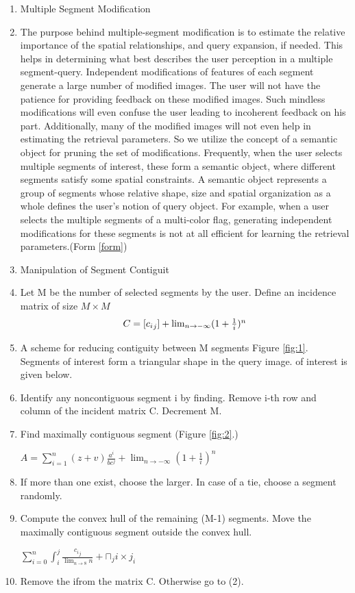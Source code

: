 \documentclass{acmart}
\begin{document}
\begin{enumerate}
    \item  	Multiple Segment Modification 
    \item   The purpose behind multiple-segment modification is to estimate the relative importance of the spatial relationships, and query expansion, if needed. This helps in determining what best describes the user perception in a multiple segment-query. Independent modifications of features of each segment generate a large number of modified images. The user will not have the patience for providing feedback on these modified images. Such mindless modifications will even confuse the user leading to incoherent feedback on his part. Additionally, many of the modified images will not even help in estimating the retrieval parameters. So we utilize the concept of a semantic object for pruning the set of modifications. Frequently, when the user selects multiple segments of interest, these form a semantic object, where different segments satisfy some spatial constraints. A semantic object represents a group of segments whose relative shape, size and spatial organization as a whole defines the user's notion of query object. For example, when a user selects the multiple segments of a multi-color flag, generating independent modifications for these segments is not at all efficient for learning the retrieval parameters.(Form \ref{form})
    \item Manipulation of Segment Contiguit
    \item Let M be the number of selected segments by the user. Define an incidence matrix of size $ M \times M$
    \begin{equation}
        $$C=[{c_i}_j]+\lim_{n \to -\infty}(1+\frac{1}{i})^n\label{form}$$
    \end{equation}
    \item A scheme for reducing contiguity between M segments Figure \ref{fig:1}. Segments of interest form a triangular shape in the query image. of interest is given below.
    
    \item Identify any noncontiguous segment i by finding. Remove i-th row and column of the incident matrix C. Decrement M.
    
    \item Find maximally contiguous segment (Figure \ref{fig:2}.)
    \begin{center}
    $A = \sum_{i=1}^n(z+v)\frac{a^i }{bc^j} + \lim_{n \to -\infty}(1+\frac{1}{i})^n$
    \end{center} 
    \item If more than one exist, choose the larger. In case of a tie, choose a segment randomly.
    \item Compute the convex hull of the remaining (M-1) segments. Move the maximally contiguous segment outside the convex hull.
    
\begin{center}
        $\sum_{i=0}^n \int_i^j \frac{{c_i}_j}{\lim_{n \to 8}n} + \sqcap{_j}i \times j_i
    $
    \end{center} 
    \item Remove the ifrom the matrix C.  Otherwise go to (2).
\end{enumerate}
\end{document}
